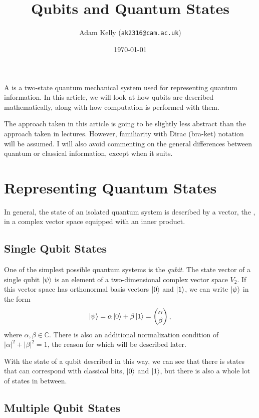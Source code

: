 \documentclass[11pt]{article}
\title{\vspace{-3\baselineskip}\ \\Qubits and Quantum States}
\author{Adam Kelly (\texttt{ak2316@cam.ac.uk})}
\date{\today}
\begin{document}
\maketitle

A  is a two-state quantum mechanical system used for representing quantum information. In this article, we will look at how qubits are described mathematically, along with how computation is performed with them.

The approach taken in this article is going to be slightly less abstract than the approach taken in lectures. However, familiarity with Dirac (bra-ket) notation will be assumed. 
I will also avoid commenting on the general differences between quantum or classical information, except when it suits.

\section{Representing Quantum States}

In general, the state of an isolated quantum system is described by a vector, the , in a complex vector space equipped with an inner product.

\subsection{Single Qubit States}

One of the simplest possible quantum systems is the \emph{qubit}. The state vector of a single qubit $\ket{\psi}$ is 
an element of a two-dimensional complex vector space $V_2$. If this vector space has orthonormal basis vectors $\ket{0}$ and $\ket{1}$, we can write $\ket{\psi}$ in the form  
$$
\ket{\psi} = \alpha \ket{0} + \beta \ket{1} = \begin{pmatrix}
	\alpha \\
	\beta
\end{pmatrix},
$$
where $\alpha, \beta \in \mathbb{C}$. There is also an additional normalization condition of $|\alpha|^2 + |\beta|^2 = 1$, the reason for which will be described later.

\begin{remark}
	With the state of a qubit described in this way, we can see that there is states that can correspond with classical bits, $\ket{0}$ and $\ket{1}$, but there is also a whole lot of states in between.
\end{remark}

\subsection{Multiple Qubit States}
\end{document}
